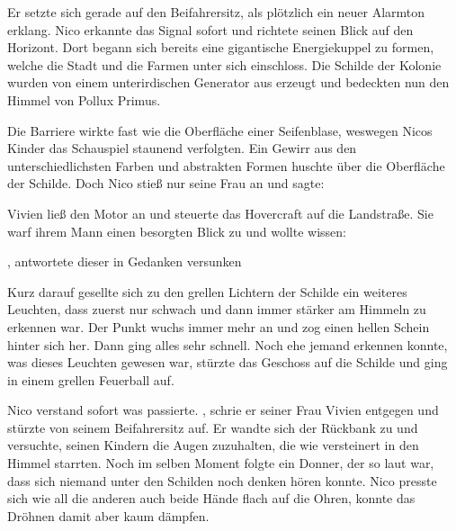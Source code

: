 \par

Er setzte sich gerade auf den Beifahrersitz, als plötzlich ein neuer Alarmton erklang. Nico erkannte das Signal sofort und richtete seinen Blick auf den Horizont. Dort begann sich bereits eine gigantische Energiekuppel zu formen, welche die Stadt und die Farmen unter sich einschloss. Die Schilde der Kolonie wurden von einem unterirdischen Generator aus erzeugt und bedeckten nun den Himmel von Pollux Primus.

\par

Die Barriere wirkte fast wie die Oberfläche einer Seifenblase, weswegen Nicos Kinder das Schauspiel staunend verfolgten. Ein Gewirr aus den unterschiedlichsten Farben und abstrakten Formen huschte über die Oberfläche der Schilde. Doch Nico stieß nur seine Frau an und sagte: 

\par

Vivien ließ den Motor an und steuerte das Hovercraft auf die Landstraße. Sie warf ihrem Mann einen besorgten Blick zu und wollte wissen: 

\par

, antwortete dieser in Gedanken versunken

\par

Kurz darauf gesellte sich zu den grellen Lichtern der Schilde ein weiteres Leuchten, dass zuerst nur schwach und dann immer stärker am Himmeln zu erkennen war. Der Punkt wuchs immer mehr an und zog einen hellen Schein hinter sich her. Dann ging alles sehr schnell. Noch ehe jemand erkennen konnte, was dieses Leuchten gewesen war, stürzte das Geschoss auf die Schilde und ging in einem grellen Feuerball auf.

\par

Nico verstand sofort was passierte. , schrie er seiner Frau Vivien entgegen und stürzte von seinem Beifahrersitz auf. Er wandte sich der Rückbank zu und versuchte, seinen Kindern die Augen zuzuhalten, die wie versteinert in den Himmel starrten. Noch im selben Moment folgte ein Donner, der so laut war, dass sich niemand unter den Schilden noch denken hören konnte. Nico presste sich wie all die anderen auch beide Hände flach auf die Ohren, konnte das Dröhnen damit aber kaum dämpfen.

